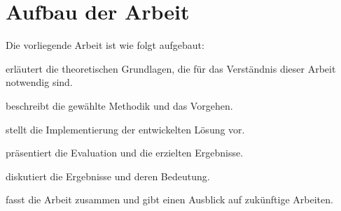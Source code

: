 \section{Aufbau der Arbeit}
\label{sec:aufbau}


Die vorliegende Arbeit ist wie folgt aufgebaut:

\textbf{} erläutert die theoretischen Grundlagen, die für das Verständnis dieser Arbeit notwendig sind.

\textbf{} beschreibt die gewählte Methodik und das Vorgehen.

\textbf{} stellt die Implementierung der entwickelten Lösung vor.

\textbf{} präsentiert die Evaluation und die erzielten Ergebnisse.

\textbf{} diskutiert die Ergebnisse und deren Bedeutung.

\textbf{} fasst die Arbeit zusammen und gibt einen Ausblick auf zukünftige Arbeiten.
